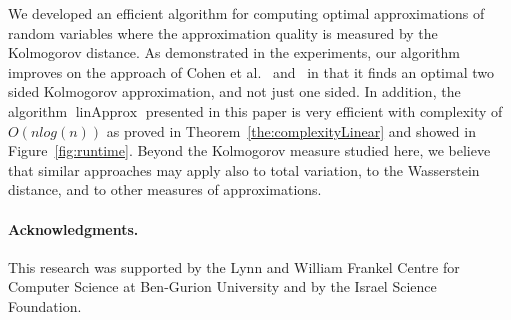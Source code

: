 \documentclass[letterpaper]{article} %
\newtheorem{example}[thm]{Example}
\DeclareMathOperator{\KlmApprox}{linApprox}
\begin{document}
We developed an efficient algorithm for computing optimal approximations of random variables where the approximation quality is measured by the Kolmogorov distance.
As demonstrated in the experiments, our algorithm improves on the approach of Cohen et al.~ and~ in that it finds an optimal two sided Kolmogorov approximation, and not just one sided. In addition, the algorithm $\KlmApprox$ presented in this paper is very efficient with complexity of $O(n log(n))$ as proved in Theorem~\ref{the:complexityLinear} and showed in Figure~\ref{fig:runtime}. Beyond the Kolmogorov measure studied here, we believe that similar approaches may apply also to total variation, to the Wasserstein distance, and to other measures of approximations. %


\paragraph{Acknowledgments.} This research was supported by the Lynn and William Frankel Centre for Computer Science at Ben-Gurion University and by the Israel Science Foundation.



\end{document}
